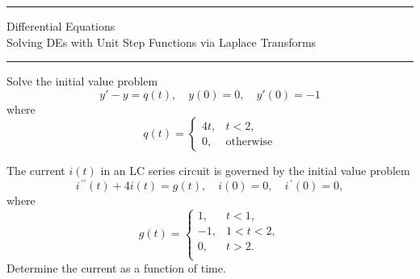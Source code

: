 \documentclass[12pt]{article}
\newcommand{\<}{\langle}
\renewcommand{\>}{\rangle}
\begin{document}
\noindent\rule{7in}{0.4pt}
\vspace{-0.75cm}
\begin{center}
	{\sc Differential Equations}\\
	{\sc Solving DEs with Unit Step Functions via Laplace Transforms}
\end{center}
\vspace{-0.5cm}
\noindent\rule{7in}{0.4pt}

\noindent Solve the initial value problem
\[
	y' - y = q(t), \quad y(0) = 0, \quad y'(0) = -1
\]
where
\[ 
	q(t) = \left\{
	\begin{array}{ll}
		4t,	& t < 2,\\
		0,	& \text{otherwise}
	\end{array} \right.
\]

\newpage

\noindent  The current $i(t)$ in an LC series circuit is governed by the initial value problem
\[
	i^{\,\prime\prime}(t) + 4i(t) = g(t), \quad i(0) = 0, \quad i^{\,\prime}(0) = 0,
\]
where
\[ 
	g(t) = \left\{
	\begin{array}{ll}
			1,	& t < 1,\\
			-1,	& 1 < t < 2,\\
			0,	& t > 2.\\
	\end{array} \right.
\]
Determine the current as a function of time.
\end{document}
